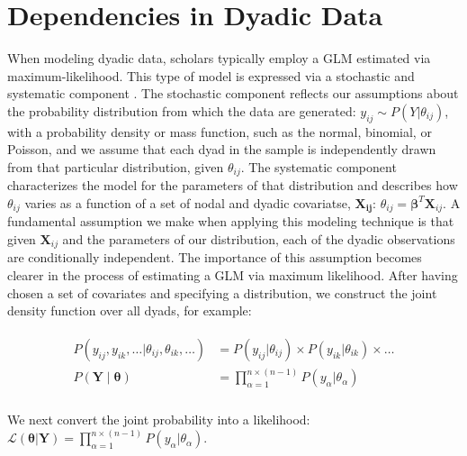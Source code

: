 \documentclass[12pt]{amsart}
\begin{document}
\section{\textbf{Dependencies in Dyadic Data}}

When modeling dyadic data, scholars typically employ a GLM estimated via maximum-likelihood. This type of model is expressed via a stochastic and systematic component \citep{pawitan:2013}. The stochastic component reflects our assumptions about the probability distribution from which the data are generated: $y_{ij} \sim P(Y | \theta_{ij})$, with a probability density or mass function, such as the normal, binomial, or Poisson, and we assume that each dyad in the sample is independently drawn from that particular distribution, given $\theta_{ij}$. The systematic component characterizes the model for the parameters of that distribution and describes how $\theta_{ij}$ varies as a function of a set of nodal and dyadic covariatse, $\mathbf{X_{ij}}$: $\theta_{ij} = \bm\beta^{T} \mathbf{X}_{ij}$. A fundamental assumption we make when applying this modeling technique is that given $\mathbf{X}_{ij}$ and the parameters of our distribution, each of the dyadic observations are conditionally independent. The importance of this assumption becomes clearer in the process of estimating a GLM via maximum likelihood. After having chosen a set of covariates and specifying a distribution, we construct the joint density function over all dyads, for example:

\vspace{-8mm}
\begin{align}
\begin{aligned}
	P(y_{ij}, y_{ik}, \ldots | \theta_{ij}, \theta_{ik}, \ldots ) &= P(y_{ij} | \theta_{ij}) \times P(y_{ik} | \theta_{ik}) \times \ldots  \\
	P(\mathbf{Y} \; | \; \bm{\theta}) &= \prod_{\alpha=1}^{n \times (n-1)} P(y_{\alpha} | \theta_{\alpha})  \\
\end{aligned}
\end{align}

\noindent We next convert the joint probability into a likelihood: $\displaystyle \mathcal{L} (\bm{\theta} | \mathbf{Y}) = \prod_{\alpha=1}^{n \times (n-1)} P(y_{\alpha} | \theta_{\alpha})$.
\end{document}
